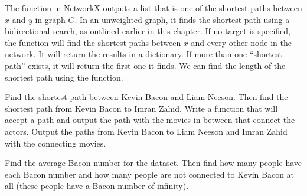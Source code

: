 The  function in NetworkX outputs a list that is one of the shortest paths between $x$ and $y$ in graph $G$.  In an unweighted graph, it finds 
the shortest path using a bidirectional search, as outlined earlier in this chapter. If no target is specified, the function will find the shortest paths between $x$ and every 
other node in the network.  It will return the results in a dictionary.  If more than one ``shortest path'' exists, it will return the first one it finds.  We can find the 
length of the shortest path using the  function.

\begin{problem}
Find the shortest path between Kevin Bacon and Liam Neeson. Then find the shortest path from Kevin Bacon to Imran Zahid. Write a function that will accept a path and output 
the path with the movies in between that connect the actors. Output the paths from Kevin Bacon to Liam Neeson and Imran Zahid with the connecting movies.
\end{problem}

\begin{problem}
Find the average Bacon number for the dataset. Then find how many people have each Bacon number and how many people are not connected to Kevin Bacon at all (these people have 
a Bacon number of infinity).
\end{problem}

